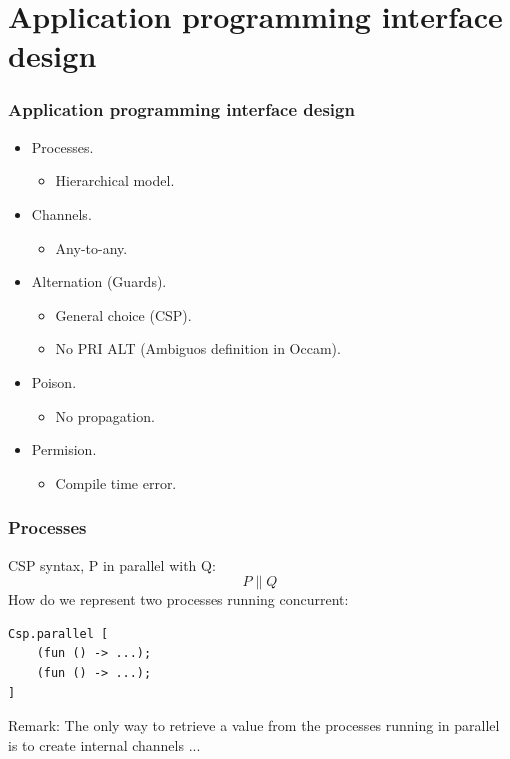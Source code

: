 \documentclass{beamer}
\begin{document}
\section[API]{Application programming interface design}
\begin{frame}
  \frametitle{Application programming interface design}
  \begin{itemize}
    \item Processes.
      \begin{itemize}
        \item Hierarchical model.
      \end{itemize}
    \item Channels. 
      \begin{itemize}
        \item Any-to-any.
      \end{itemize}
    \item Alternation (Guards).
      \begin{itemize}
        \item General choice (CSP).
        \item No PRI ALT (Ambiguos definition in Occam).
      \end{itemize}
    \item Poison.
      \begin{itemize}
        \item No propagation.
      \end{itemize}
    \item Permision.
      \begin{itemize}
        \item Compile time error.
      \end{itemize}
  \end{itemize}
\end{frame}

\begin{frame}[fragile]
  \frametitle{Processes}
  CSP syntax, P in parallel with Q:
    \[P \parallel Q\]
  How do we represent two processes running concurrent:
\scriptsize
\begin{verbatim}
Csp.parallel [
    (fun () -> ...);
    (fun () -> ...);
]
\end{verbatim}
\normalsize
Remark: The only way to retrieve a value from the processes running in parallel
is to create internal channels ...
\end{frame}
\end{document}
